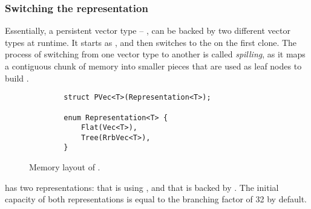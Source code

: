 \subsubsection*{Switching the representation}
Essentially, a persistent vector type -- \pvec{}, can be backed by two different vector types at runtime. It starts as \stdvec{}, and then switches to the \rrbvec{} on the first clone. The process of switching from one vector type to another is called \emph{spilling}, as it maps a contiguous chunk of memory into smaller pieces that are used as leaf nodes to build \rrbvec{}.

\begin{figure}[!htbp]

    \centering
    \begin{verbatim}
        struct PVec<T>(Representation<T>);

        enum Representation<T> {
            Flat(Vec<T>),
            Tree(RrbVec<T>),
        }
    \end{verbatim}

    \caption{Memory layout of \pvec{}.}
    \label{fig:pvec-memory-representation}
\end{figure}

\pvec{} has two representations:  that is using \stdvec{}, and  that is backed by \rrbvec{}. The initial capacity of both representations is equal to the branching factor of 32 by default.

